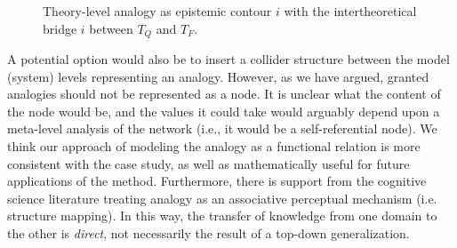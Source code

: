 \documentclass[11pt, oneside]{article}   	%
\begin{document}

%
\begin{figure} [ht!]
\begin{center}
\caption{Theory-level analogy as epistemic contour $i$ with the intertheoretical bridge $i$ between $T_Q$ and $T_F$.}
\label{fig:SystemLadder(STRONG)}
\end{center}
\end{figure}





















A potential option would also be to insert a collider structure between the model (system) levels representing an analogy.  However, as we have argued, granted analogies should not be represented as a node.  It is unclear what the content of the node would be, and the values it could take would arguably  depend upon a meta-level analysis of the network (i.e., it would be a self-referential node).  We think our approach of modeling the analogy as a functional relation is more consistent with the case study, as well as mathematically useful for future applications of the method.  Furthermore, there is support from the cognitive science literature treating analogy as an associative perceptual mechanism (i.e. structure mapping).  In this way, the transfer of knowledge from one domain to the other is \emph{direct}, not necessarily the result of a top-down generalization.  
\end{document}
